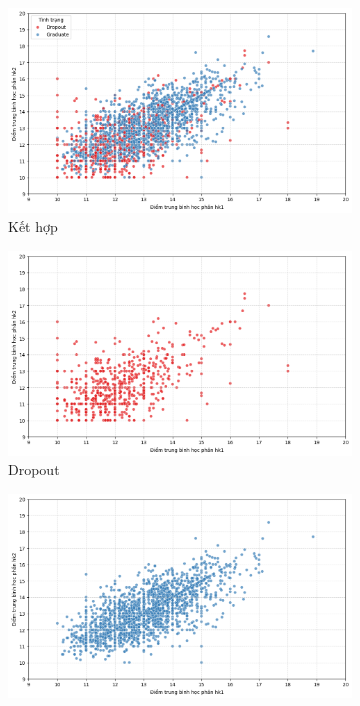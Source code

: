     \begin{figure}[htp]
        \centering
        \begin{subfigure}{0.80\textwidth}
            \centering
            \includegraphics[width=\textwidth]{images/Table_Dropout_Grade_Target_ZoomIn.png}
            \caption{Kết hợp}
            \label{fig:Table_Dropout_Grade_Target_ZoomIn}
        \end{subfigure}
        \vspace{0.5cm}
        \begin{subfigure}{0.45\textwidth}
            \includegraphics[width=\textwidth]{images/Table_Dropout_GradeDropout_Target_ZoomIn.png}
            \caption{Dropout}
            \label{fig:Table_Dropout_GradeDropout_Target_ZoomIn}
        \end{subfigure}
        \hfill
        \begin{subfigure}{0.45\textwidth}
            \includegraphics[width=\textwidth]{images/Table_Dropout_GradeGraduate_Target_ZoomIn.png}

\end{subfigure}
\end{figure}
